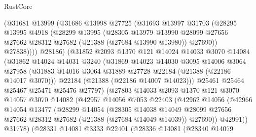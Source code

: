 \begin{lexlean}{RustCore}
\begin{coremodule}
              (@31681
                @13999
                (@31686
                  @13998
                  @27725
                  (@31693
                    @13997
                    @31703
                    (@28295
                      @13995
                      @4918
                      (@28299
                        @13995
                        (@28305
                          @13979
                          @13990
                          @28099
                          @27656
                          @27662
                          @28312
                          @27682
                          (@21388 (@27684 @13990 @13980))
                          @27690))
                      @27838))))
              @28186)
            (@31852
              @2093
              @1370
              @121
              @14024
              @14033
              @3070
              @14084
              (@31862
                @14024
                @14031
                @3240
                (@31869
                  @14023
                  @14030
                  @3095
                  @14006
                  @3064
                  @27958
                  (@31883 @14016 @3064 @31889 @27728 @22184 (@21388 (@22186 @14017 @3070)))
                  @22184
                  (@21388 (@22186 @14007 @14023)))
                @25461
                @25464
                @25467
                @25471
                @25476
                @27797)
              (@27803
                @14033
                @2093
                @1370
                @121
                @3070
                @14057
                @3070
                @14082
                (@42957
                  @14056
                  @7053
                  @22403
                  (@42962
                    @14056
                    (@42966
                      @14054
                      @13477
                      (@28299
                        @14054
                        (@28305
                          @14038
                          @14049
                          @28099
                          @27656
                          @27662
                          @28312
                          @27682
                          (@21388 (@27684 @14049 @14039))
                          @27690))
                      @42991))
                  @31778)
                (@28331
                  @14081
                  @3333
                  @22401
                  (@28336
                    @14081
                    (@28340
                      @14079

\end{coremodule}
\end{lexlean}
